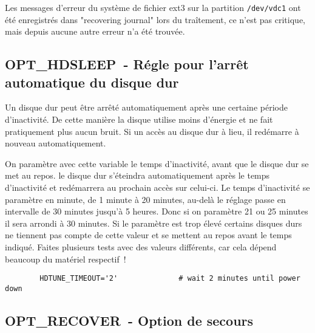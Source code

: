      Les messages d'erreur du système de fichier ext3 sur la partition \texttt{/dev/vdc1}
	 ont été enregistrés dans "recovering journal" lors du traîtement, ce n'est pas critique,
	 mais depuis aucune autre erreur n'a été trouvée.


\subsection {OPT\_HDSLEEP~- Régle pour l'arrêt automatique du disque dur}

    Un disque dur peut être arrêté automatiquement après une certaine
    période d'inactivité. De cette manière la disque utilise moins d'énergie
    et ne fait pratiquement plus aucun bruit. Si un accès au disque dur à lieu,
    il redémarre à nouveau automatiquement.


\begin{description}

    On paramètre avec cette variable le temps d'inactivité, avant que le
    disque dur se met au repos. le disque dur s'éteindra automatiquement
    après le temps d'inactivité et redémarrera au prochain accès sur
    celui-ci. Le temps d'inactivité se paramètre en minute, de 1 minute à
    20 minutes, au-delà le réglage passe en intervalle de 30 minutes
    jusqu'à 5 heures. Donc si on paramètre 21 ou 25 minutes il sera arrondi
    à 30 minutes. Si le paramètre est trop élevé certains disques durs ne
    tiennent pas compte de cette valeur et se mettent au repos avant le
    temps indiqué. Faites plusieurs tests avec des valeurs différents,
    car cela dépend beaucoup du matériel respectif~!

\begin{example}
\begin{verbatim}
        HDTUNE_TIMEOUT='2'              # wait 2 minutes until power down
\end{verbatim}
\end{example}

\end{description}


\subsection {OPT\_RECOVER~- Option de secours}

